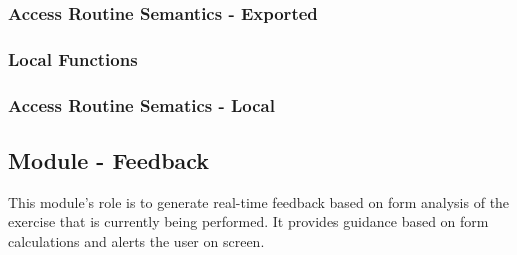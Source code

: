 \documentclass[12pt, titlepage]{article}
\begin{document}
\subsubsection{Access Routine Semantics - Exported}

\subsubsection{Local Functions}

\subsubsection{Access Routine Sematics - Local}

\subsection{Module - Feedback}
This module's role is to generate real-time feedback based on form analysis of the exercise that is currently being performed.
It provides guidance based on form calculations and alerts the user on screen. 

\end{document}
